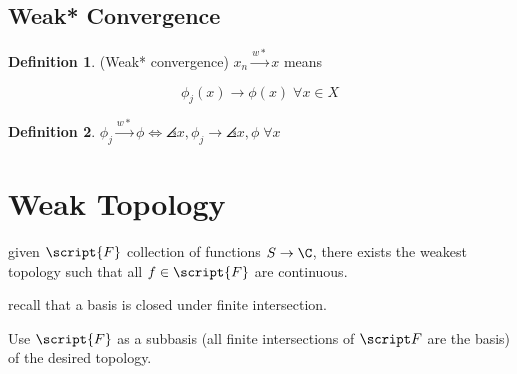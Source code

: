 \documentclass[a5paper]{article}
\theoremstyle{definition}%
\newtheorem*{definition*}{Definition}
\numberwithin{exercise}{section}
\theoremstyle{remark}%
\begin{document}
\subsection{Weak* Convergence}

\begin{definition*}(Weak* convergence)
$x_n\xrightarrow{w*}x$ means 

$$\phi_j(x)\to \phi	(x) \; \forall x\in X$$
\end{definition*}

\begin{definition*}
$\phi_j\xrightarrow{w*}\phi \iff \angles{x,\phi_j} \to \angles{x,\phi} \;\forall x$
\end{definition*}

\section{Weak Topology}

given $\script{F}$ collection of functions $S\to \C$, there exists the weakest topology such that all $f\in\script{F}$ are continuous. 

recall that a basis is closed under finite intersection. 

Use $\script{F}$ as a subbasis  (all finite intersections of $\script F$ are the basis) of the desired topology. 
\end{document}
